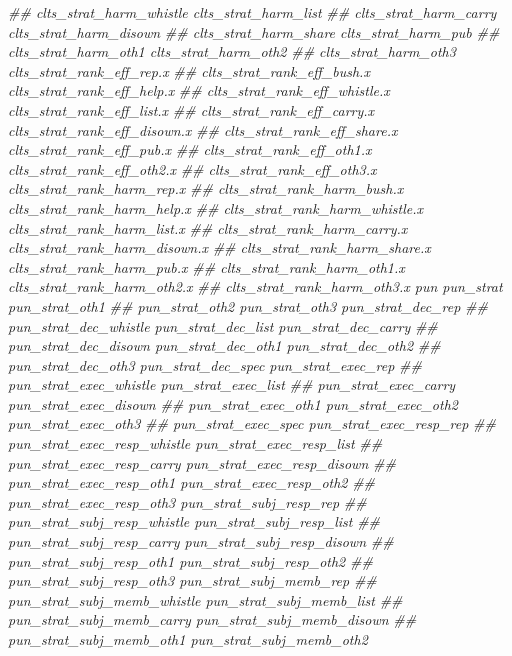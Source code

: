 \documentclass[
]{article}
\newenvironment{Shaded}{\begin{snugshade}}{\end{snugshade}}
\newcommand{\CommentTok}[1]{\textcolor[rgb]{0.56,0.35,0.01}{\textit{#1}}}
\begin{document}
\begin{Shaded}
\begin{Highlighting}[]
\CommentTok{##      clts_strat_harm_whistle clts_strat_harm_list}
\CommentTok{##      clts_strat_harm_carry clts_strat_harm_disown}
\CommentTok{##      clts_strat_harm_share clts_strat_harm_pub}
\CommentTok{##      clts_strat_harm_oth1 clts_strat_harm_oth2}
\CommentTok{##      clts_strat_harm_oth3 clts_strat_rank_eff_rep.x}
\CommentTok{##      clts_strat_rank_eff_bush.x clts_strat_rank_eff_help.x}
\CommentTok{##      clts_strat_rank_eff_whistle.x clts_strat_rank_eff_list.x}
\CommentTok{##      clts_strat_rank_eff_carry.x clts_strat_rank_eff_disown.x}
\CommentTok{##      clts_strat_rank_eff_share.x clts_strat_rank_eff_pub.x}
\CommentTok{##      clts_strat_rank_eff_oth1.x clts_strat_rank_eff_oth2.x}
\CommentTok{##      clts_strat_rank_eff_oth3.x clts_strat_rank_harm_rep.x}
\CommentTok{##      clts_strat_rank_harm_bush.x clts_strat_rank_harm_help.x}
\CommentTok{##      clts_strat_rank_harm_whistle.x clts_strat_rank_harm_list.x}
\CommentTok{##      clts_strat_rank_harm_carry.x clts_strat_rank_harm_disown.x}
\CommentTok{##      clts_strat_rank_harm_share.x clts_strat_rank_harm_pub.x}
\CommentTok{##      clts_strat_rank_harm_oth1.x clts_strat_rank_harm_oth2.x}
\CommentTok{##      clts_strat_rank_harm_oth3.x pun pun_strat pun_strat_oth1}
\CommentTok{##      pun_strat_oth2 pun_strat_oth3 pun_strat_dec_rep}
\CommentTok{##      pun_strat_dec_whistle pun_strat_dec_list pun_strat_dec_carry}
\CommentTok{##      pun_strat_dec_disown pun_strat_dec_oth1 pun_strat_dec_oth2}
\CommentTok{##      pun_strat_dec_oth3 pun_strat_dec_spec pun_strat_exec_rep}
\CommentTok{##      pun_strat_exec_whistle pun_strat_exec_list}
\CommentTok{##      pun_strat_exec_carry pun_strat_exec_disown}
\CommentTok{##      pun_strat_exec_oth1 pun_strat_exec_oth2 pun_strat_exec_oth3}
\CommentTok{##      pun_strat_exec_spec pun_strat_exec_resp_rep}
\CommentTok{##      pun_strat_exec_resp_whistle pun_strat_exec_resp_list}
\CommentTok{##      pun_strat_exec_resp_carry pun_strat_exec_resp_disown}
\CommentTok{##      pun_strat_exec_resp_oth1 pun_strat_exec_resp_oth2}
\CommentTok{##      pun_strat_exec_resp_oth3 pun_strat_subj_resp_rep}
\CommentTok{##      pun_strat_subj_resp_whistle pun_strat_subj_resp_list}
\CommentTok{##      pun_strat_subj_resp_carry pun_strat_subj_resp_disown}
\CommentTok{##      pun_strat_subj_resp_oth1 pun_strat_subj_resp_oth2}
\CommentTok{##      pun_strat_subj_resp_oth3 pun_strat_subj_memb_rep}
\CommentTok{##      pun_strat_subj_memb_whistle pun_strat_subj_memb_list}
\CommentTok{##      pun_strat_subj_memb_carry pun_strat_subj_memb_disown}
\CommentTok{##      pun_strat_subj_memb_oth1 pun_strat_subj_memb_oth2}

\end{Highlighting}
\end{Shaded}
\end{document}
